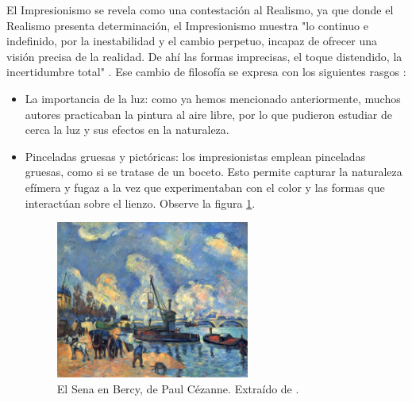 \documentclass[../main.tex]{subfiles}
\begin{document}
El Impresionismo se revela como una contestación al Realismo, ya que donde el Realismo presenta determinación, el Impresionismo muestra "lo continuo e indefinido, por la inestabilidad y el cambio perpetuo, incapaz de ofrecer una visión precisa de la realidad. De ahí las formas imprecisas, el toque distendido, la incertidumbre total" \cite{EditorialSalvat2006}. Ese cambio de filosofía se expresa con los siguientes rasgos \cite{Sienra2019}:
\begin{itemize}
    \item La importancia de la luz: como ya hemos mencionado anteriormente, muchos autores practicaban la pintura al aire libre, por lo que pudieron estudiar de cerca la luz y sus efectos en la naturaleza.
    \item Pinceladas gruesas y pictóricas: los impresionistas emplean pinceladas gruesas, como si se tratase de un boceto. Esto permite capturar la naturaleza efímera y fugaz a la vez que experimentaban con el color y las formas que interactúan sobre el lienzo. Observe la figura \ref{fig:cezanne_sena}.
    
    \begin{figure}[h]
        \centering
        \includegraphics[width=0.6\textwidth]{imagenes/El Sena en Bercy.jpg}
        \caption[El Sena en Bercy, de Paul Cézanne]{El Sena en Bercy, de Paul Cézanne. Extraído de \cite{Cezanne1878}.}
        \label{fig:cezanne_sena}
    \end{figure}
    

\end{itemize}
\end{document}
